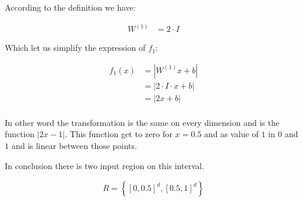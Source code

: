 
According to the definition we have:

\begin{align*}
    W^{(1)} &= 2 \cdot I
\end{align*}

Which let us simplify the expression of $f_1$:

\begin{align*}
    f_1(x) &= | W^{(1)} x + b | \\
    &= | 2 \cdot I \cdot x + b | \\
    &= | 2 x + b | \\
\end{align*}

In other word the transformation is the same on every dimension and is the function $| 2 x - 1 |$.
This function get to zero for $x=0.5$ and as value of $1$ in $0$ and $1$ and is linear between those points.

In conclusion there is two input region on this interval.

\begin{align*}
    R = \left\{ \left[ 0, 0.5 \right]^d , \left[ 0.5, 1 \right]^d \right\}
\end{align*}


